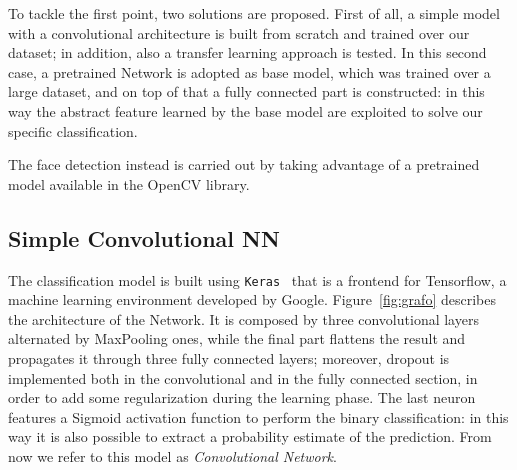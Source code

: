 \documentclass[10pt,twocolumn,letterpaper]{article}
\begin{document}
To tackle the first point, two solutions are proposed. First of all, a simple model with a convolutional architecture is built from scratch and trained over our dataset; in addition, also a transfer learning approach is tested. In this second case, a pretrained Network is adopted as base model, which was trained over a large dataset, and on top of that a fully connected part is constructed: in this way the abstract feature learned by the base model are exploited to solve our specific classification.

The face detection instead is carried out by taking advantage of a pretrained model available in the OpenCV library.


\subsection{Simple Convolutional NN}
\label{NN_1}
The classification model is built using \texttt{Keras}~\cite{keras} that is a frontend for Tensorflow, a machine learning environment developed by Google. Figure~\ref{fig:grafo} describes the architecture of the Network. It is composed by three convolutional layers alternated by MaxPooling ones, while the final part flattens the result and propagates it through three fully connected layers; moreover, dropout is implemented both in the convolutional and in the fully connected section, in order to add some regularization during the learning phase. The last neuron features a Sigmoid activation function to perform the binary classification: in this way it is also possible to extract a probability estimate of the prediction. From now we refer to this model as \textit{Convolutional Network}.

\end{document}
